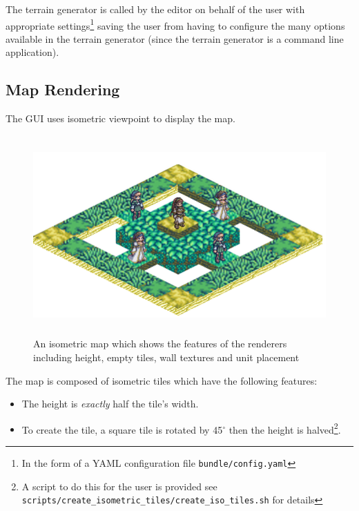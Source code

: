The terrain generator is called by the editor on behalf of the user with appropriate settings\footnote{In the form of a YAML configuration file \texttt{bundle/config.yaml}} saving the user from having to configure the many options available in the terrain generator (since the terrain generator is a command line application).


\subsection{Map Rendering}
\label{ssub:map_rendering}

The GUI uses isometric viewpoint to display the map. 

\begin{figure}[htbp]
	\centering
		\includegraphics[height=3in]{figures/imp-map.png}
	\caption{An isometric map which shows the features of the renderers including height, empty tiles, wall textures and unit placement}
	\label{fig:figures_imp-map}
\end{figure}

The map is composed of isometric tiles which have the following features:

\begin{itemize}[topsep=0mm,noitemsep ]
	\item  The height is \emph{exactly} half the tile's width.
	\item  To create the tile, a square tile is rotated by 45$^{\circ}$ then the height is halved\footnote{A script to do this for the user is provided see \lstinline!scripts/create_isometric_tiles/create_iso_tiles.sh! for details}.
\end{itemize}

